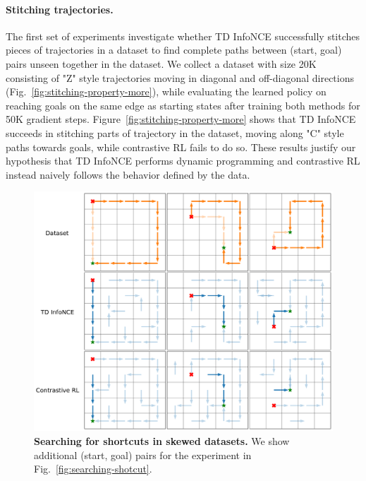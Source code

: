 \documentclass{article} %
\begin{document}
\paragraph{Stitching trajectories.} The first set of experiments investigate whether TD InfoNCE successfully stitches pieces of trajectories in a dataset to find complete paths between (start, goal) pairs unseen together in the dataset. We collect a dataset with size 20K consisting of "Z" style trajectories moving in diagonal and off-diagonal directions (Fig.~\ref{fig:stitching-property-more}), while evaluating the learned policy on reaching goals on the same edge as starting states after training both methods for 50K gradient steps. Figure~\ref{fig:stitching-property-more} shows that TD InfoNCE succeeds in stitching parts of trajectory in the dataset, moving along "C" style paths towards goals, while contrastive RL fails to do so. These results justify our hypothesis that TD InfoNCE performs dynamic programming and contrastive RL instead naively follows the behavior defined by the data.

\begin{figure}
    \centering
    \includegraphics[width=\linewidth]{figures/policy_analysis/shortcut_searching_full.pdf}
    \caption{\textbf{Searching for shortcuts in skewed datasets.} We show additional (start, goal) pairs for the experiment in Fig.~\ref{fig:searching-shotcut}.}
    \label{fig:searching-shortcut-more}
\end{figure}
\end{document}
